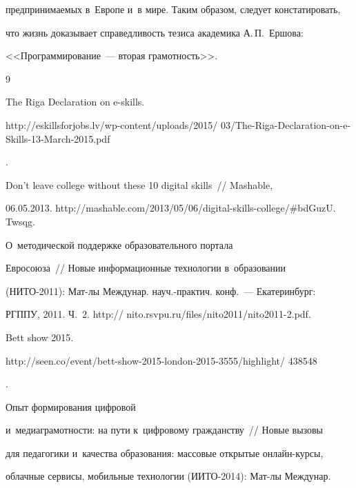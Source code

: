 предпринимаемых в~Европе и~в мире. Таким образом, следует констатировать, 


что жизнь доказывает справедливость тезиса академика А.\,П.~Ершова: 


<<Программирование~--- вторая грамотность>>.


  


{\small\frenchspacing


{%




\begin{thebibliography}{9}




The Riga Declaration on e-skills. {\sf  


 http://eskillsforjobs.lv/wp-content/uploads/2015/ 03/The-Riga-Declaration-on-e-Skills-13-March-2015.pdf}.




 Don't leave college without these 10 digital skills~/\!\!/ Mashable,\linebreak 


06.05.2013. {\sf http://mashable.com/2013/05/06/digital-skills-college/\#bdGuzU. Twsqg}.




 О~методической поддержке образовательного портала 


Евро\-со\-юза~/\!\!/ Новые информационные технологии в~образовании  


(НИТО-2011): Мат-лы Междунар. науч.-практич. конф.~--- Екатеринбург: 


РГППУ, 2011.  Ч.~2. {\sf http:// nito.rsvpu.ru/files/nito2011/nito2011-2.pdf}.




Bett show 2015. {\sf  


http://seen.co/event/bett-show-2015-london-2015-3555/highlight/ 438548}.




 Опыт формирования цифровой 


и~медиаграмотности: на пути к~цифровому гражданству~/\!\!/ Новые вызовы 


для педагогики и~ка\-че\-ст\-ва образования: массовые открытые он\-лайн-кур\-сы, 


облачные сервисы, мобильные технологии (ИИТО-2014): Мат-лы Междунар. 



\end{thebibliography}}}
